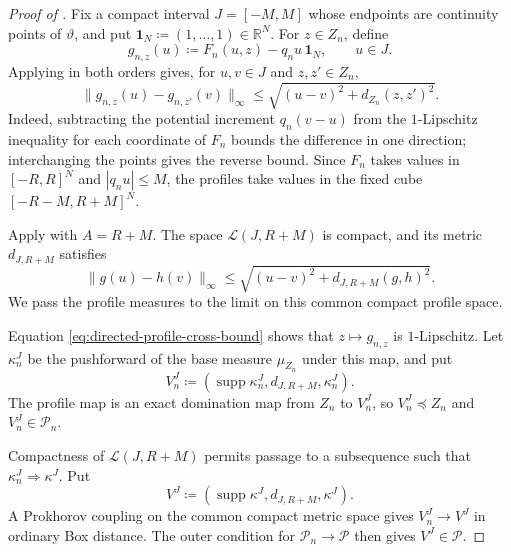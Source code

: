 \documentclass{amsart}
\numberwithin{equation}{section}
\theoremstyle{plain}
\theoremstyle{definition}
\theoremstyle{remark}
\newcommand{\R}{\mathbb R}
\DeclareMathOperator{\supp}{supp}
\begin{document}
\begin{proof}[Proof of ]
Fix a compact interval $J=[-M,M]$ whose endpoints are continuity points of $\vartheta$, and put
$\mathbf1_N\coloneqq(1,\ldots,1)\in\R^N$.  For $z\in Z_n$, define
\begin{equation}\label{eq:directed-transformed-profile}
 g_{n,z}(u)\coloneqq F_n(u,z)-q_nu\,\mathbf1_N,
 \qquad u\in J.
\end{equation}
Applying  in both orders gives, for $u,v\in J$ and $z,z'\in Z_n$,
\begin{equation}\label{eq:directed-profile-cross-bound}
 \|g_{n,z}(u)-g_{n,z'}(v)\|_\infty
 \le\sqrt{(u-v)^2+d_{Z_n}(z,z')^2}.
\end{equation}
Indeed, subtracting the potential increment $q_n(v-u)$ from the $1$-Lipschitz inequality for each coordinate of $F_n$
bounds the difference in one direction; interchanging the points gives the reverse bound.  Since $F_n$ takes values in
$[-R,R]^N$ and $|q_nu|\le M$, the profiles take values in the fixed cube $[-R-M,R+M]^N$.

Apply  with $A=R+M$.  The space $\mathscr L(J,R+M)$ is compact, and its metric
$d_{J,R+M}$ satisfies
\begin{equation}\label{eq:directed-profile-evaluation}
 \|g(u)-h(v)\|_\infty
 \le\sqrt{(u-v)^2+d_{J,R+M}(g,h)^2}.
\end{equation}
We pass the profile measures to the limit on this common compact profile space.

Equation \eqref{eq:directed-profile-cross-bound} shows that $z\mapsto g_{n,z}$ is $1$-Lipschitz.  Let $\kappa_n^J$ be the
pushforward of the base measure $\mu_{Z_n}$ under this map, and put
\[
 V_n^J\coloneqq(\supp\kappa_n^J,d_{J,R+M},\kappa_n^J).
\]
The profile map is an exact domination map from $Z_n$ to $V_n^J$, so $V_n^J\preceq Z_n$ and $V_n^J\in\mathcal P_n$.

Compactness of $\mathscr L(J,R+M)$ permits passage to a subsequence such that $\kappa_n^J\Rightarrow\kappa^J$.  Put
\[
 V^J\coloneqq(\supp\kappa^J,d_{J,R+M},\kappa^J).
\]
A Prokhorov coupling on the common compact metric space gives $V_n^J\to V^J$ in ordinary Box distance.  The outer condition
for $\mathcal P_n\to\mathcal P$ then gives $V^J\in\mathcal P$.


\end{proof}
\end{document}
